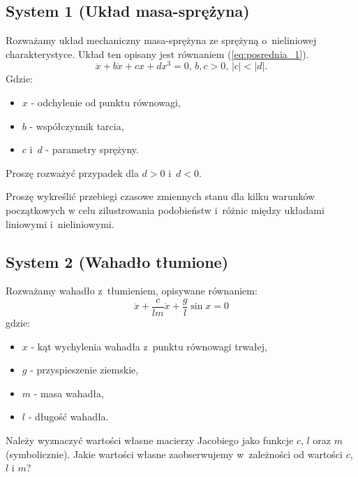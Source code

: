 \documentclass{sprawozdanie-agh}
\begin{document}
        \subsection{System 1 (Układ masa-sprężyna)} \label{sec:posrednia_1}
        Rozważamy układ mechaniczny masa-sprężyna ze sprężyną o~nieliniowej charakterystyce.
        Układ ten opisany jest równaniem (\ref{eq:posrednia_1}).
        \begin{equation}\label{eq:posrednia_1}
            \ddot{x} + b\dot{x} + cx + dx^{3} = 0, \, b,c > 0,\, |c|<|d|.
        \end{equation}
        Gdzie:
        \begin{itemize}
            \item $x$ - odchylenie od punktu równowagi,
            \item $b$ - współczynnik tarcia,
            \item $c$ i~$d$ - parametry sprężyny.
        \end{itemize}
        Proszę rozważyć przypadek dla $d>0$ i~$d<0$.

        Proszę wykreślić przebiegi czasowe zmiennych stanu dla kilku warunków
        początkowych w celu zilustrowania podobieństw i~różnic między układami liniowymi i~nieliniowymi.

        \subsection{System 2 (Wahadło tłumione)} \label{sec:posrednia_2}
        Rozważamy wahadło z~tłumieniem, opisywane równaniem:
        \begin{equation}\label{eq:posrednia_2}
            \ddot{x} + \frac{c}{lm}\dot{x} + \frac{g}{l}\sin{x} = 0
        \end{equation}
        gdzie:
        \begin{itemize}
            \item $x$ - kąt wychylenia wahadła z~punktu równowagi trwałej,
            \item $g$ - przyspieszenie ziemskie,
            \item $m$ - masa wahadła,
            \item $l$ - długość wahadła.
        \end{itemize}

        Należy wyznaczyć wartości własne macierzy Jacobiego jako funkcje $c$, $l$ oraz $m$ (symbolicznie). 
        Jakie wartości własne zaobserwujemy w~zależności od wartości $c$, $l$ i $m$?
\end{document}
